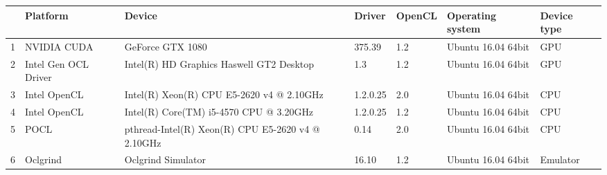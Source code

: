 \begin{tabular}{lllllll}
\toprule
{} &              Platform &                                             Device &    Driver & OpenCL &    Operating system & Device type \\
\midrule
1 &           NVIDIA CUDA &                                   GeForce GTX 1080 &    375.39 &    1.2 &  Ubuntu 16.04 64bit &         GPU \\
2 &  Intel Gen OCL Driver &           Intel(R) HD Graphics Haswell GT2 Desktop &       1.3 &    1.2 &  Ubuntu 16.04 64bit &         GPU \\
3 &          Intel OpenCL &          Intel(R) Xeon(R) CPU E5-2620 v4 @ 2.10GHz &  1.2.0.25 &    2.0 &  Ubuntu 16.04 64bit &         CPU \\
4 &          Intel OpenCL &            Intel(R) Core(TM) i5-4570 CPU @ 3.20GHz &  1.2.0.25 &    1.2 &  Ubuntu 16.04 64bit &         CPU \\
5 &                  POCL &  pthread-Intel(R) Xeon(R) CPU E5-2620 v4 @ 2.10GHz &      0.14 &    2.0 &  Ubuntu 16.04 64bit &         CPU \\
6 &              Oclgrind &                                 Oclgrind Simulator &     16.10 &    1.2 &  Ubuntu 16.04 64bit &    Emulator \\
\bottomrule
\end{tabular}
